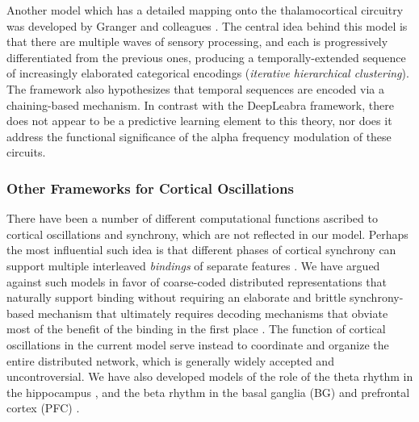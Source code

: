 \documentclass[11pt,twoside]{article}
\newif\myifpdf
\begin{document}
Another model which has a detailed mapping onto the thalamocortical circuitry was developed by Granger and colleagues \cite{RodriguezWhitsonGranger04}.  The central idea behind this model is that there are multiple waves of sensory processing, and each is progressively differentiated from the previous ones, producing a temporally-extended sequence of increasingly elaborated categorical encodings ({\em iterative hierarchical clustering}).  The framework also hypothesizes that temporal sequences are encoded via a chaining-based mechanism.  In contrast with the DeepLeabra framework, there does not appear to be a predictive learning element to this theory, nor does it address the functional significance of the alpha frequency modulation of these circuits.

\subsubsection{Other Frameworks for Cortical Oscillations}

There have been a number of different computational functions ascribed to cortical oscillations and synchrony, which are not reflected in our model.  Perhaps the most influential such idea is that different phases of cortical synchrony can support multiple interleaved {\em bindings} of separate features \cite[e.g.,]{WangBuhmannvonderMalsburg90,GrayEngelKonigEtAl92,EngelKonigKreiterEtAl92,ZemelWilliamsMozer95,HummelBiederman92}.  We have argued against such models in favor of coarse-coded distributed representations that naturally support binding without requiring an elaborate and brittle synchrony-based mechanism that ultimately requires decoding mechanisms that obviate most of the benefit of the binding in the first place \cite{OReillyBusby02,OReillyBusbySoto03,CerOReilly06,OReillyPetrovCohenEtAl14}.  The function of cortical oscillations in the current model serve instead to coordinate and organize the entire distributed network, which is generally widely accepted and uncontroversial.  We have also developed models of the role of the theta rhythm in the hippocampus \cite{KetzMorkondaOReilly13}, and the beta rhythm in the basal ganglia (BG) and prefrontal cortex (PFC) \cite{KetzJensenOReilly15,OReillyPetrovCohenEtAl14,JilkLebiereOReillyEtAl08}.
\end{document}
